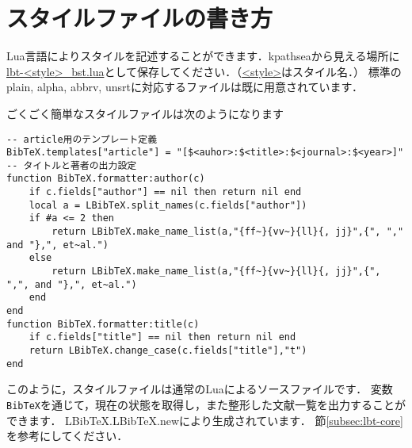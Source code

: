 \documentclass[a4paper]{ltjsarticle}
\begin{document}
\section{スタイルファイルの書き方}
Lua言語によりスタイルを記述することができます．kpathseaから見える場所に\url{lbt-<style>_bst.lua}として保存してください．（\url{<style>}はスタイル名．）
標準のplain, alpha, abbrv, unsrtに対応するファイルは既に用意されています．

ごくごく簡単なスタイルファイルは次のようになります
\begin{lstlisting}
-- article用のテンプレート定義
BibTeX.templates["article"] = "[$<auhor>:$<title>:$<journal>:$<year>]"
-- タイトルと著者の出力設定
function BibTeX.formatter:author(c)
	if c.fields["author"] == nil then return nil end
	local a = LBibTeX.split_names(c.fields["author"])
	if #a <= 2 then
		return LBibTeX.make_name_list(a,"{ff~}{vv~}{ll}{, jj}",{", "," and "},", et~al.")
	else
		return LBibTeX.make_name_list(a,"{ff~}{vv~}{ll}{, jj}",{", ",", and "},", et~al.")
	end
end
function BibTeX.formatter:title(c)
	if c.fields["title"] == nil then return nil end
	return LBibTeX.change_case(c.fields["title"],"t")
end
\end{lstlisting}

このように，スタイルファイルは通常のLuaによるソースファイルです．
変数\verb|BibTeX|を通じて，現在の状態を取得し，また整形した文献一覧を出力することができます．
LBibTeX.LBibTeX.newにより生成されています．
節\ref{subsec:lbt-core}を参考にしてください．
\end{document}
